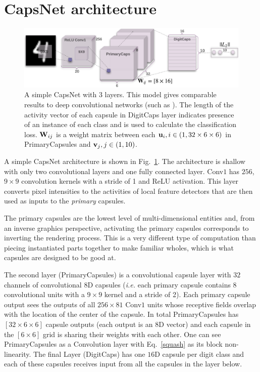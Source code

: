 \documentclass{article}
\begin{document}
\section{CapsNet architecture}
\begin{figure}[t]
  \caption{A simple CapsNet with 3 layers. This model gives comparable results to deep convolutional networks (such as \cite{chang2015batch}). The length of the activity vector of each capsule in DigitCaps layer indicates presence of an instance of each class and is used to calculate the classification loss. ${\bf W}_{ij}$ is a weight matrix between each ${\bf u}_i, i \in (1, 32\times6\times6)$ in PrimaryCapsules and ${\bf v}_j, j \in (1, 10)$. }
\label{capsnetArch}
  \centering
    \includegraphics[width=\textwidth]{capsulearch}
\end{figure}
A simple CapsNet architecture is shown in Fig.~\ref{capsnetArch}. The architecture is shallow with only two convolutional layers and one fully connected layer. Conv$1$ has $256$, $9 \times 9$ convolution kernels with a stride of 1 and ReLU activation. This layer converts pixel intensities to the activities of local feature detectors that are then used as inputs to the {\it primary} capsules.

The primary capsules are the lowest level of multi-dimensional entities and, from an inverse graphics perspective, activating the primary capsules corresponds to inverting the rendering process. This is a very different type of computation than piecing instantiated parts together to make familiar wholes, which is what capsules are designed to be good at.

The second layer (PrimaryCapsules) is a convolutional capsule layer with $32$ channels of convolutional $8$D capsules ({\it i.e.} each primary capsule contains 8 convolutional units with a $9 \times 9$ kernel and a stride of 2). Each primary capsule output sees the outputs of all $256 \times 81$ Conv$1$ units whose receptive fields overlap with the location of the center of the capsule. In total PrimaryCapsules has $[32 \times 6 \times 6]$ capsule outputs (each output is an $8$D vector) and each capsule in the $[6 \times 6]$ grid is sharing their weights with each other. One can see PrimaryCapsules as a Convolution layer with Eq.~\ref{squash} as its block non-linearity. The final Layer (DigitCaps) has one $16$D capsule per digit class and each of these capsules receives input from all the capsules in the layer below.
\end{document}
